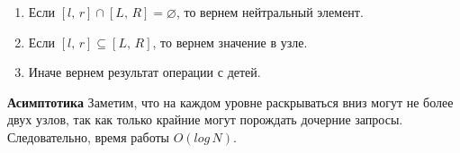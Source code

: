 \begin{enumerate}
    \item Если $[l,\,r] \cap [L,\,R] = \varnothing$, то вернем нейтральный элемент.
    \item Если $[l,\,r] \subseteq [L,\,R]$, то вернем значение в узле.
    \item Иначе вернем результат операции с детей.
\end{enumerate}

\textbf{Асимптотика} Заметим, что на каждом уровне раскрываться вниз могут не более двух узлов, так как только крайние могут порождать дочерние запросы. Следовательно, время работы $O(log\,N)$.

\pagebreak